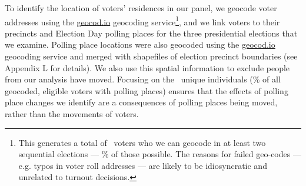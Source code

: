 \documentclass{cup_PSRM}
\begin{document}
To identify the location of voters' residences in our panel, we geocode voter addresses using the \url{geocod.io} geocoding service\footnote{This generates a total of \unskip~voters who we can geocode in at least two sequential elections --- \unskip\% of  those possible.  The reasons for failed geo-codes --- e.g. typos in voter roll addresses --- are likely to be idiosyncratic and unrelated to turnout decisions.}, and we link voters to their precincts and Election Day polling places for the three presidential elections that we examine. Polling place locations were also geocoded using the \url{geocod.io} geocoding service and merged with shapefiles of election precinct boundaries (see Appendix L for details).  We also use this spatial information to exclude people from our analysis have moved. Focusing on the \unskip~unique individuals (\unskip\% of all geocoded, eligible voters with polling places) ensures that the effects of polling place changes we identify are a consequences of polling places being moved, rather than the movements of voters.
\end{document}
